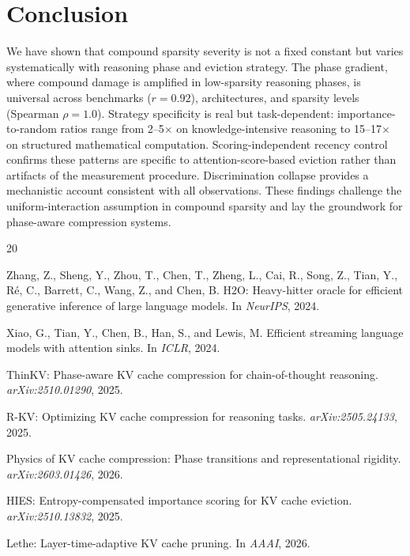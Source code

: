 \documentclass[11pt,a4paper]{article}
\begin{document}
\section{Conclusion}

We have shown that compound sparsity severity is not a fixed constant but varies systematically with reasoning phase and eviction strategy. The phase gradient, where compound damage is amplified in low-sparsity reasoning phases, is universal across benchmarks ($r{=}0.92$), architectures, and sparsity levels (Spearman $\rho{=}1.0$). Strategy specificity is real but task-dependent: importance-to-random ratios range from 2--5$\times$ on knowledge-intensive reasoning to 15--17$\times$ on structured mathematical computation. Scoring-independent recency control confirms these patterns are specific to attention-score-based eviction rather than artifacts of the measurement procedure. Discrimination collapse provides a mechanistic account consistent with all observations. These findings challenge the uniform-interaction assumption in compound sparsity and lay the groundwork for phase-aware compression systems.


\begin{thebibliography}{20}

Zhang, Z., Sheng, Y., Zhou, T., Chen, T., Zheng, L., Cai, R., Song, Z., Tian, Y., R\'e, C., Barrett, C., Wang, Z., and Chen, B.
\newblock H2O: Heavy-hitter oracle for efficient generative inference of large language models.
\newblock In \emph{NeurIPS}, 2024.

Xiao, G., Tian, Y., Chen, B., Han, S., and Lewis, M.
\newblock Efficient streaming language models with attention sinks.
\newblock In \emph{ICLR}, 2024.

ThinKV: Phase-aware KV cache compression for chain-of-thought reasoning.
\newblock \emph{arXiv:2510.01290}, 2025.

R-KV: Optimizing KV cache compression for reasoning tasks.
\newblock \emph{arXiv:2505.24133}, 2025.

Physics of KV cache compression: Phase transitions and representational rigidity.
\newblock \emph{arXiv:2603.01426}, 2026.

HIES: Entropy-compensated importance scoring for KV cache eviction.
\newblock \emph{arXiv:2510.13832}, 2025.

Lethe: Layer-time-adaptive KV cache pruning.
\newblock In \emph{AAAI}, 2026.

\end{thebibliography}
\end{document}
